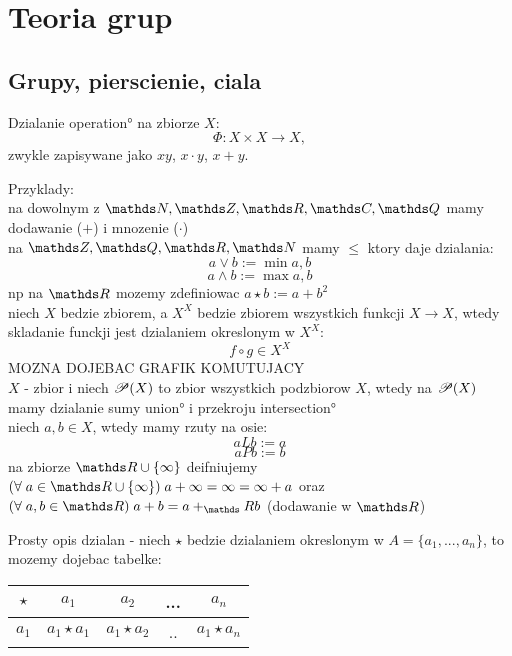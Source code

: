 \section{Teoria grup}

\subsection{Grupy, pierscienie, ciala}
\begin{multicols}{2}

    {\color{def}Dzialanie} \ang{operation} na zbiorze $X$:
    $$\Phi: X\times X\to X,$$
    zwykle zapisywane jako $xy$, $x\cdot y$, $x+y$.\smallskip

    {\color{acc}Przyklady:}\\
    \point na dowolnym z $\N,\Z, \R, \C, \Q$ mamy dodawanie ($+$) i mnozenie ($\cdot$)\\
    \point na $\Z, \Q,\R, \N$ mamy $\leq$ ktory daje dzialania: 
    $$a\lor b:=\min{a, b}$$
    $$a\land b:=\max{a,b}$$
    \point np na $\R$ mozemy zdefiniowac $a\star b:= a+b^2$\\
    \point niech $X$ bedzie zbiorem, a $X^X$ bedzie zbiorem wszystkich funkcji $X\to X$, wtedy skladanie funckji jest dzialaniem okreslonym w $X^X$:
    $$f\circ g\in X^X$$ 
    {\color{cyan}MOZNA DOJEBAC GRAFIK KOMUTUJACY}\\
    \point $X$ - zbior i niech $\mathcal{P}(X)$ to zbior wszystkich podzbiorow $X$, wtedy na $\mathcal{P}(X)$ mamy dzialanie sumy \ang{union} i przekroju \ang{intersection}\\
    \point niech $a, b\in X$, wtedy mamy rzuty na osie:
    $$aLb:=a$$
    $$aPb:=b$$
    \point na zbiorze $\R\cup\{\infty\}$ deifniujemy $(\forall\;a\in \R\cup\{\infty\})\;a+\infty=\infty=\infty+a$ oraz $(\forall\;a, b\in \R)\;a+b=a+_\R b$ (dodawanie w $\R$)
    \medskip

    Prosty opis dzialan - niech $\star$ bedzie dzialaniem okreslonym w $A=\{a_1,..., a_n\}$, to mozemy dojebac tabelke:

    \begin{center}
    \begin{tabular}{ c | c | c | c | c |}
        $\star$ & $a_1$ & $a_2$ & ... & $a_n$\\

        \hline

        $a_1$ & $a_1\star a_1$ & $a_1\star a_2$ & .. & $a_1\star a_n$\\
        
        \hline


\end{tabular}
\end{center}
\end{multicols}
